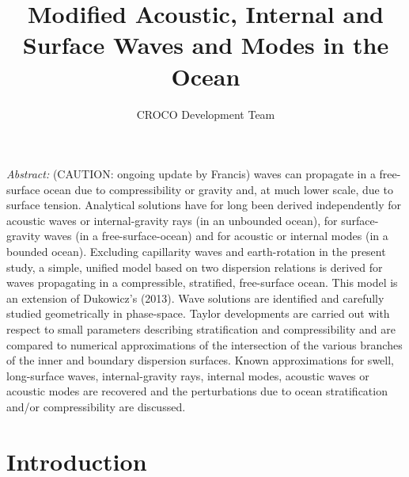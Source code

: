 \documentclass[a4paper,11pt]{article}
\title{Modified Acoustic, Internal and Surface Waves and Modes in the Ocean}
\author{CROCO Development Team}
\begin{document}
\renewcommand{\thepage}{}
\hypersetup{pdfborder=0 0 0}
\maketitle
\setcounter{tocdepth}{2}

\let\oldref\ref
\renewcommand{\ref}[1]{(\oldref{#1})}


\textit{Abstract:} \color{red} (CAUTION: ongoing update by Francis) \color{black} waves can propagate in a free-surface ocean due to compressibility or gravity and, at much lower scale, due to surface tension. Analytical solutions have for long been derived independently for acoustic waves or internal-gravity rays (in an unbounded ocean), for surface-gravity waves (in a free-surface-ocean) and for acoustic or internal modes (in a bounded ocean). Excluding capillarity waves and earth-rotation in the present study, a simple, unified model based on two dispersion relations is derived for waves propagating in a compressible, stratified, free-surface ocean. This model is an extension of Dukowicz's (2013). Wave solutions are identified and carefully studied geometrically in phase-space. Taylor developments are carried out with respect to small parameters describing stratification and compressibility and are compared to numerical approximations of the intersection of the various branches of the inner and boundary dispersion surfaces. Known approximations for swell, long-surface waves, internal-gravity rays, internal modes, acoustic waves or acoustic modes are recovered and the perturbations due to ocean stratification and/or compressibility are discussed.\\

\newpage
\renewcommand{\thepage}{\arabic{page}}
\setcounter{page}{1}
\section{Introduction}
\end{document}

